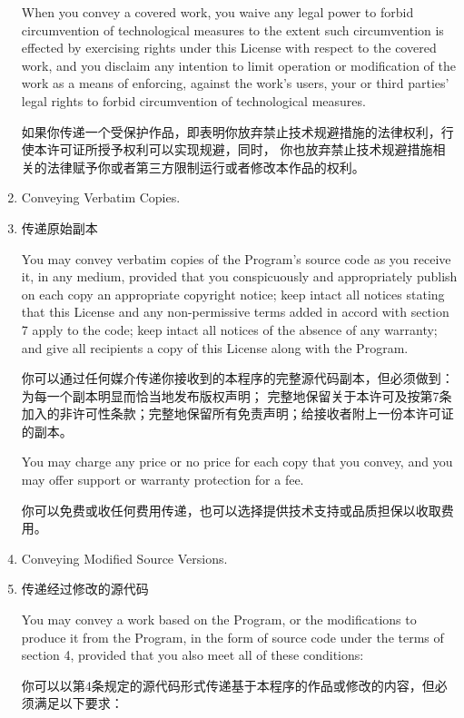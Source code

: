 \documentclass[11pt]{article}
\begin{document}
\begin{enumerate}
        When you convey a covered work, you waive any legal power to forbid
        circumvention of technological measures to the extent such circumvention
        is effected by exercising rights under this License with respect to
        the covered work, and you disclaim any intention to limit operation or
        modification of the work as a means of enforcing, against the work's
        users, your or third parties' legal rights to forbid circumvention of
        technological measures.

        如果你传递一个受保护作品，即表明你放弃禁止技术规避措施的法律权利，行使本许可证所授予权利可以实现规避，同时，
        你也放弃禁止技术规避措施相关的法律赋予你或者第三方限制运行或者修改本作品的权利。

  \item Conveying Verbatim Copies.
  \item 传递原始副本

        You may convey verbatim copies of the Program's source code as you
        receive it, in any medium, provided that you conspicuously and
        appropriately publish on each copy an appropriate copyright notice;
        keep intact all notices stating that this License and any
        non-permissive terms added in accord with section 7 apply to the code;
        keep intact all notices of the absence of any warranty; and give all
        recipients a copy of this License along with the Program.

        你可以通过任何媒介传递你接收到的本程序的完整源代码副本，但必须做到：为每一个副本明显而恰当地发布版权声明；
        完整地保留关于本许可及按第7条加入的非许可性条款；完整地保留所有免责声明；给接收者附上一份本许可证的副本。


        You may charge any price or no price for each copy that you convey,
        and you may offer support or warranty protection for a fee.

        你可以免费或收任何费用传递，也可以选择提供技术支持或品质担保以收取费用。

  \item Conveying Modified Source Versions.
  \item 传递经过修改的源代码

        You may convey a work based on the Program, or the modifications to
        produce it from the Program, in the form of source code under the
        terms of section 4, provided that you also meet all of these conditions:

        你可以以第4条规定的源代码形式传递基于本程序的作品或修改的内容，但必须满足以下要求：


\end{enumerate}
\end{document}
